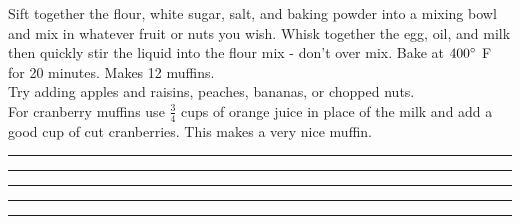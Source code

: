 \documentclass[twoside]{book}
\begin{document}
	\noindent
	Sift together the flour, white sugar, salt, and baking powder into a mixing bowl and mix in whatever fruit or nuts you wish.  Whisk together the egg, oil, and milk then quickly stir the liquid into the flour mix - don't over mix.  Bake at \(400\degree\) F for 20 minutes.  Makes 12 muffins.\\

	\noindent
	Try adding apples and raisins, peaches, bananas, or chopped nuts.\\

	\noindent
	For cranberry muffins use \(\frac{3}{4}\) cups of orange juice in place of the milk and add a good cup of cut cranberries.  This makes a very nice muffin.
	\vspace{3em} \hrule
	\vspace{3em} \hrule
	\vspace{3em} \hrule
	\vspace{3em} \hrule
	\vspace{3em} \hrule
	\newpage
\end{document}
